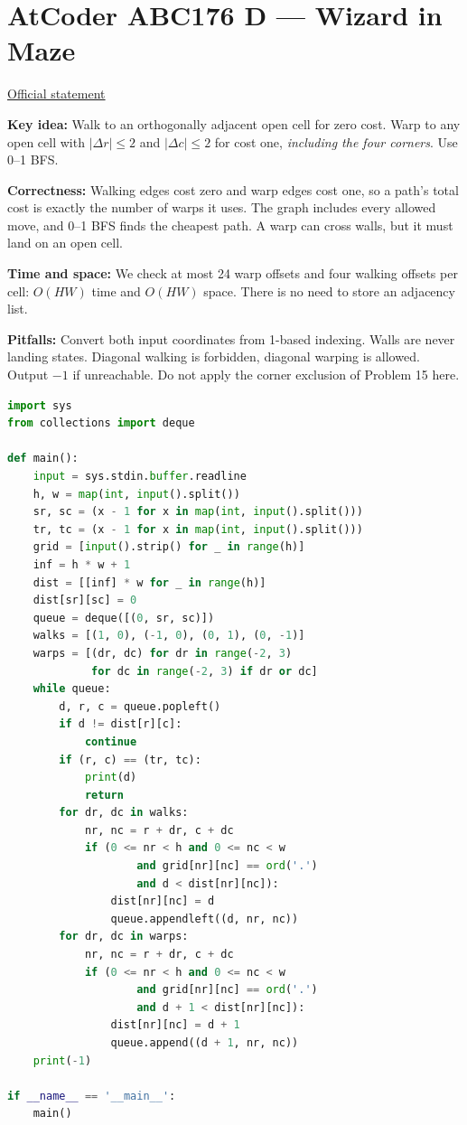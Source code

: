 \documentclass[11pt]{article}
\newcommand{\insight}[1]{\par\medskip\noindent\textbf{Key idea:} #1}
\newcommand{\correct}[1]{\par\textbf{Correctness:} #1}
\newcommand{\bounds}[1]{\par\textbf{Time and space:} #1}
\newcommand{\pitfalls}[1]{\par\textbf{Pitfalls:} #1}
\begin{document}
\section{AtCoder ABC176 D --- Wizard in Maze}
\href{https://atcoder.jp/contests/abc176/tasks/abc176_d}{Official statement}
\insight{Walk to an orthogonally adjacent open cell for zero cost. Warp to any open cell with $|\Delta r|\leq2$ and $|\Delta c|\leq2$ for cost one, \emph{including the four corners}. Use 0--1 BFS.}
\correct{Walking edges cost zero and warp edges cost one, so a path's total cost is exactly the number of warps it uses. The graph includes every allowed move, and 0--1 BFS finds the cheapest path. A warp can cross walls, but it must land on an open cell.}
\bounds{We check at most 24 warp offsets and four walking offsets per cell: $O(HW)$ time and $O(HW)$ space. There is no need to store an adjacency list.}
\pitfalls{Convert both input coordinates from 1-based indexing. Walls are never landing states. Diagonal walking is forbidden, diagonal warping is allowed. Output $-1$ if unreachable. Do not apply the corner exclusion of Problem 15 here.}
\begin{lstlisting}[language=Python,caption={P08 --- Python 3},label={lst:p08-python}]
import sys
from collections import deque

def main():
    input = sys.stdin.buffer.readline
    h, w = map(int, input().split())
    sr, sc = (x - 1 for x in map(int, input().split()))
    tr, tc = (x - 1 for x in map(int, input().split()))
    grid = [input().strip() for _ in range(h)]
    inf = h * w + 1
    dist = [[inf] * w for _ in range(h)]
    dist[sr][sc] = 0
    queue = deque([(0, sr, sc)])
    walks = [(1, 0), (-1, 0), (0, 1), (0, -1)]
    warps = [(dr, dc) for dr in range(-2, 3)
             for dc in range(-2, 3) if dr or dc]
    while queue:
        d, r, c = queue.popleft()
        if d != dist[r][c]:
            continue
        if (r, c) == (tr, tc):
            print(d)
            return
        for dr, dc in walks:
            nr, nc = r + dr, c + dc
            if (0 <= nr < h and 0 <= nc < w
                    and grid[nr][nc] == ord('.')
                    and d < dist[nr][nc]):
                dist[nr][nc] = d
                queue.appendleft((d, nr, nc))
        for dr, dc in warps:
            nr, nc = r + dr, c + dc
            if (0 <= nr < h and 0 <= nc < w
                    and grid[nr][nc] == ord('.')
                    and d + 1 < dist[nr][nc]):
                dist[nr][nc] = d + 1
                queue.append((d + 1, nr, nc))
    print(-1)

if __name__ == '__main__':
    main()
\end{lstlisting}
\end{document}

